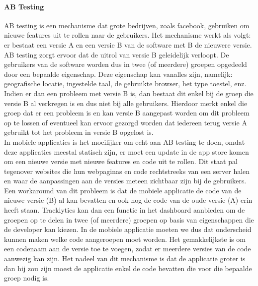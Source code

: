 \paragraph{AB Testing}
AB testing is een mechanisme dat grote bedrijven, zoals facebook, gebruiken om nieuwe features uit te rollen naar de gebruikers. Het mechanisme werkt als volgt: er bestaat een versie A en een versie B van de software met B de nieuwere versie. AB testing zorgt ervoor dat de uitrol van versie B geleidelijk verloopt. De gebruikers van de software worden dus in twee (of meerdere) groepen opgedeeld door een bepaalde eigenschap. Deze eigenschap kan vanalles zijn, namelijk: geografische locatie, ingestelde taal, de gebruikte browser, het type toestel, enz. Indien er dan een probleem met versie B is, dan bestaat dit enkel bij de groep die versie B al verkregen is en dus niet bij alle gebruikers. Hierdoor merkt enkel die groep dat er een probleem is en kan versie B aangepast worden om dit probleem op te lossen of eventueel kan ervoor gezorgd worden dat iedereen terug versie A gebruikt tot het probleem in versie B opgelost is. \\

In mobiele applicaties is het moeilijker om echt aan AB testing te doen, omdat deze applicaties meestal statisch zijn, er moet een update in de app store komen om een nieuwe versie met nieuwe features en code uit te rollen. Dit staat pal tegenover websites die hun webpaginas en code rechtstreeks van een server halen en waar de aanpassingen aan de versies meteen zichtbaar zijn bij de gebruikers. 
Een workaround van dit probleem is dat de mobiele applicatie de code van de nieuwe versie (B) al kan bevatten en ook nog de code van de oude versie (A) erin heeft staan. Tracklytics kan dan een functie in het dashboard aanbieden om de groepen op te delen in twee (of meerdere) groepen op basis van eigenschappen die de developer kan kiezen. In de mobiele applicatie moeten we dus dat onderscheid kunnen maken welke code aangeroepen moet worden. Het gemakkelijkste is om een codenaam aan de versie toe te voegen, zodat er meerdere versies van de code aanwezig kan zijn. 
Het nadeel van dit mechanisme is dat de applicatie groter is dan hij zou zijn moest de applicatie enkel de code bevatten die voor die bepaalde groep nodig is.


